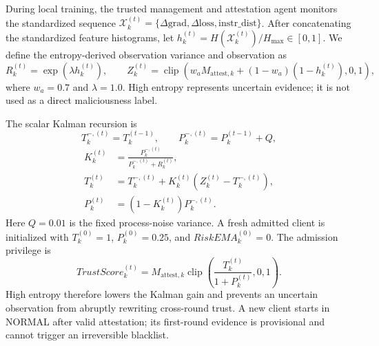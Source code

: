 \documentclass[final,5p,times,twocolumn]{elsarticle/elsarticle}
\begin{document}
During local training, the trusted management and attestation agent monitors
the standardized sequence
$\mathcal{X}_k^{(t)}=\{\Delta\mathrm{grad},\Delta\mathrm{loss},
\mathrm{instr\_dist}\}$. After concatenating the standardized feature
histograms, let $h_k^{(t)}=H(\mathcal{X}_k^{(t)})/H_{\max}\in[0,1]$. We define
the entropy-derived observation variance and observation as
\begin{equation}
    R_k^{(t)}=\exp(\lambda h_k^{(t)}),\qquad
    Z_k^{(t)}=\operatorname{clip}\!\left(
    w_aM_{\mathrm{attest},k}+(1-w_a)(1-h_k^{(t)}),0,1\right),
\end{equation}
where $w_a=0.7$ and $\lambda=1.0$. High entropy represents uncertain evidence;
it is not used as a direct maliciousness label.

The scalar Kalman recursion is
\begin{equation}
    T_k^{-,(t)}=T_k^{(t-1)},\qquad P_k^{-,(t)}=P_k^{(t-1)}+Q,
\end{equation}
\begin{equation}
\begin{aligned}
    K_k^{(t)}&=\frac{P_k^{-,(t)}}{P_k^{-,(t)}+R_k^{(t)}},\\
    T_k^{(t)}&=T_k^{-,(t)}+K_k^{(t)}
        \left(Z_k^{(t)}-T_k^{-,(t)}\right),\\
    P_k^{(t)}&=(1-K_k^{(t)})P_k^{-,(t)}.
\end{aligned}
\end{equation}
Here $Q=0.01$ is the fixed process-noise variance. A fresh admitted client is
initialized with $T_k^{(0)}=1$, $P_k^{(0)}=0.25$, and
$RiskEMA_k^{(0)}=0$. The admission privilege is
\begin{equation}
    TrustScore_k^{(t)}=M_{\mathrm{attest},k}
    \operatorname{clip}\!\left(\frac{T_k^{(t)}}{1+P_k^{(t)}},0,1\right).
\end{equation}
High entropy therefore lowers the Kalman gain and prevents an uncertain
observation from abruptly rewriting cross-round trust. A new client starts in
NORMAL after valid attestation; its first-round evidence is provisional and
cannot trigger an irreversible blacklist.
\end{document}
